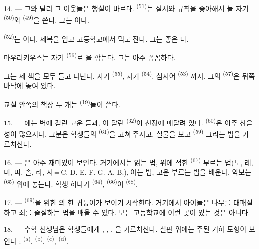 14. --- 그와 달리 그 이웃들은 행실이 바르다. 
\textsuperscript{(51)}는 질서와 규칙을 좋아해서 늘 자기 
\textsuperscript{(50)}와  \textsuperscript{(49)}을 쓴다. 그는
이다.

 \textsuperscript{(52)}는 이다. 제복을 입고
고등학교에서 먹고 잔다. 그는 좋은 다.

마우리키우스는 자기  \textsuperscript{(56)}로 을 깎는다.
그는 아주 꼼꼼하다.

그는 제 책을 모두 들고 다닌다. 자기  \textsuperscript{(55)}, 자기
 \textsuperscript{(54)}, 심지어  \textsuperscript{(53)}
까지. 그의  \textsuperscript{(57)}은 뒤쪽 바닥에 놓여 있다.

교실 안쪽의 책상 두 개는  \textsuperscript{(19)}들이 쓴다.

\VUsaut{4.6mm}
\VUsaut{3.4mm}

15. --- 에는 벽에 걸린 고운 들과, 이 달린
 \textsuperscript{(62)}이 천장에 매달려 있다. 
\textsuperscript{(60)}은 아주 참을성이 많으시다. 그분은 학생들의 
\textsuperscript{(61)}을 고쳐 주시고, 실물을 보고  \textsuperscript{(59)}
그리는 법을 가르치신다.

16. --- 은 아주 재미있어 보인다. 거기에서는  읽는 법,
 위에 적힌  \textsuperscript{(67)} 부르는 법(도, 레, 미,
파, 솔, 라, 시\,=\,C. D. E. F. G. A. B.),  아는 법, 고운
 부르는 법을 배운다. 악보는  \textsuperscript{(65)} 위에
놓는다. 학생 하나가  \textsuperscript{(64)},
 \textsuperscript{(66)}이 
\textsuperscript{(68)}.

17. ---  \textsuperscript{(69)}을 위한 의 한 귀퉁이가
보이기 시작한다. 거기에서 아이들은 나무를 대패질하고 쇠를 줄질하는 법을 배울 수 있다.
모든 고등학교에 이런 곳이 있는 것은 아니다.

\VUsaut{5.0mm}
\VUsaut{3.6mm}

18. --- 수학 선생님은 학생들에게 , , ,
을 가르치신다. 칠판 위에는 주된 기하 도형이 보인다 : 
\textsuperscript{(a)},  \textsuperscript{(b)}, 
\textsuperscript{(c)},  \textsuperscript{(d)}.

